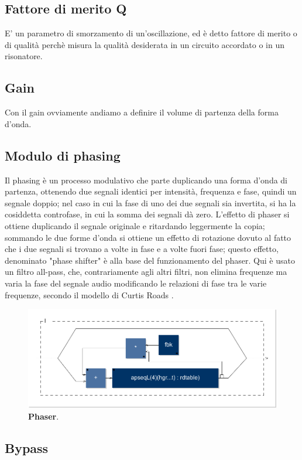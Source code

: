 \documentclass[
	a4paper,
	twocolumn
	]{article}
\begin{document}
\subsection*{Fattore di merito Q}

E' un parametro di smorzamento di un'oscillazione, ed è detto fattore di merito
o di qualità perchè misura la qualità desiderata in un circuito accordato o in
un risonatore.

\subsection*{Gain}

Con il gain ovviamente andiamo a definire il volume di partenza della forma
d’onda.

\subsection*{Modulo di phasing}

Il phasing è un processo modulativo che parte duplicando una forma d'onda di
partenza, ottenendo due segnali identici per intensità, frequenza e fase,
quindi un segnale doppio; nel caso in cui la fase di uno dei due segnali sia
invertita, si ha la cosiddetta controfase, in cui la somma dei segnali dà zero.
L'effetto di phaser si ottiene duplicando il segnale originale e ritardando
leggermente la copia; sommando le due forme d'onda si ottiene un effetto di
rotazione dovuto al fatto che i due segnali si trovano a volte in fase e a
volte fuori fase; questo effetto, denominato "phase shifter" è alla base del
funzionamento del phaser. Qui è usato un filtro all-pass, che, contrariamente
agli altri filtri, non elimina frequenze ma varia la fase del segnale audio
modificando le relazioni di fase tra le varie frequenze, secondo il modello di
Curtis Roads \cite{cr96cmt}.

\begin{figure}[h]
\begin{center}
\includegraphics[width=.47\textwidth]{img/phaser.pdf}
\caption{\textbf{Phaser}.}
\label{phas}
\end{center}
\end{figure}

\subsection*{Bypass}
\end{document}
